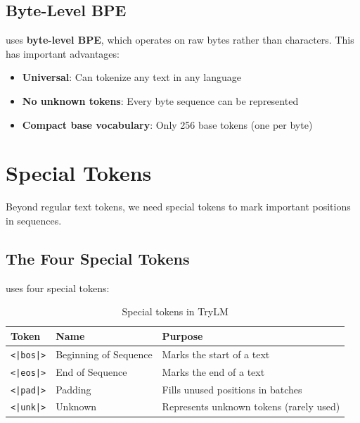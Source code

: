 \subsection{Byte-Level BPE}

\TryLM uses \textbf{byte-level BPE}, which operates on raw bytes rather than characters. This has important advantages:

\begin{itemize}
    \item \textbf{Universal}: Can tokenize any text in any language
    \item \textbf{No unknown tokens}: Every byte sequence can be represented
    \item \textbf{Compact base vocabulary}: Only 256 base tokens (one per byte)
\end{itemize}

\section{Special Tokens}

Beyond regular text tokens, we need special tokens to mark important positions in sequences.

\subsection{The Four Special Tokens}

\TryLM uses four special tokens:

\begin{table}[H]
\centering
\begin{tabular}{lll}
\toprule
\textbf{Token} & \textbf{Name} & \textbf{Purpose} \\
\midrule
\texttt{<|bos|>} & Beginning of Sequence & Marks the start of a text \\
\texttt{<|eos|>} & End of Sequence & Marks the end of a text \\
\texttt{<|pad|>} & Padding & Fills unused positions in batches \\
\texttt{<|unk|>} & Unknown & Represents unknown tokens (rarely used) \\
\bottomrule
\end{tabular}
\caption{Special tokens in TryLM}
\label{tab:special-tokens}
\end{table}

